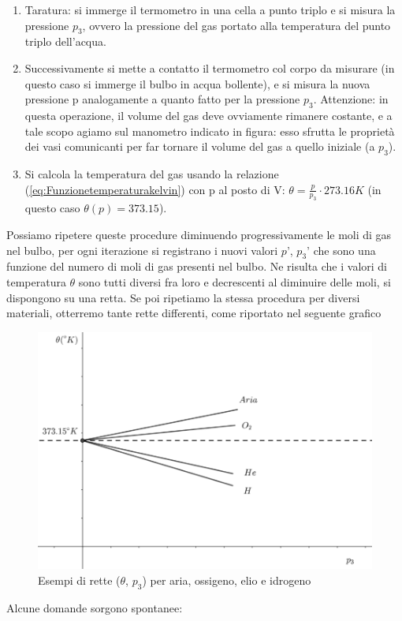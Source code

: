 \documentclass[10pt,a4paper]{article}
\begin{document}
\begin{enumerate}
	\item Taratura: si immerge il termometro in una cella a punto triplo e si misura la pressione $p_3$, ovvero la pressione del gas portato alla temperatura del punto triplo dell'acqua. 
	\item Successivamente si mette a contatto il termometro col corpo da misurare (in questo caso si immerge il bulbo in acqua bollente), e si misura la nuova pressione p analogamente a quanto fatto per la pressione $p_3$. Attenzione: in questa operazione, il volume del gas deve ovviamente rimanere costante, e a tale scopo agiamo sul manometro indicato in figura: esso sfrutta le proprietà dei vasi comunicanti per far tornare il volume del gas a quello iniziale (a $p_3$).
	\item Si calcola la temperatura del gas usando la relazione (\ref{eq:Funzionetemperaturakelvin}) con p al posto di V: $\theta = \frac{p}{p_3} \cdot 273.16 K$ (in questo caso $\theta(p) = 373.15$).
\end{enumerate}
Possiamo ripetere queste procedure diminuendo progressivamente le moli di gas nel bulbo, per ogni iterazione si registrano i nuovi valori $p’$, $p_3’$ che sono una funzione del numero di moli di gas presenti nel bulbo. Ne risulta che i valori di temperatura $\theta$ sono tutti diversi fra loro e decrescenti al diminuire delle moli, si dispongono su una retta. Se poi ripetiamo la stessa procedura per diversi materiali, otterremo tante rette differenti, come riportato nel seguente grafico
\begin{figure}[h!]
	\centering
	\includegraphics[width=0.6\linewidth]{../images/temp_e_puntotriplo}
	\caption{Esempi di rette ($\theta$, $p_3$) per aria, ossigeno, elio e idrogeno}
	\label{fig:tempepuntotriplo}
\end{figure}
\FloatBarrier
Alcune domande sorgono spontanee:
\end{document}
